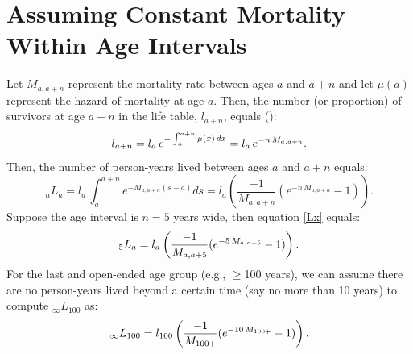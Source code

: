\documentclass[11pt,letterpaper]{article}
\theoremstyle{plain}
\theoremstyle{remark}
\numberwithin{equation}{section}
\begin{document}
\section{Assuming Constant Mortality Within Age Intervals}
Let $M_{a,a+n}$ represent the mortality rate between ages $a$ and
$a+n$ and let $\mu(a)$ represent the hazard of mortality at age
$a$. Then, the number (or proportion) of survivors at age $a+n$ in the
life table, $l_{a+n}$, equals (\cite{PreHeuGui00}):
\begin{equation}
l_{a+n}=l_{a}\,e^{-\int_a^{a+n}\mu(x)\,dx}=l_{a}\,e^{-n\,M_{a,a+n}}.\notag
\end{equation}
Then, the number of person-years lived between ages $a$ and $a+n$ equals:
\begin{equation}
_nL_{a}=l_a\,\int_a^{a+n} e^{-M_{a,a+n}(s-a)} ds=l_a \left(\frac{-1}{M_{a,a+n}}(e^{-n\,M_{a,a+n}}-1) \right).
\label{Lx}
\end{equation}
Suppose the age interval is $n=5$ years wide, then equation \eqref{Lx}
equals:
\begin{equation}
_5L_{a}=l_a \left(\frac{-1}{M_{a,a+5}}(e^{-5\,M_{a,a+5}}-1) \right).\notag
\end{equation}
For the last and open-ended age group (e.g., $\geq$100 years), we can assume there
are no person-years lived beyond a certain time (say no more than 10
years) to compute $_{\infty}L_{100}$ as:
\begin{equation}
_{\infty}L_{100}=l_{100} \left(\frac{-1}{M_{100+}}(e^{-10\,M_{100+}}-1) \right).\notag
\end{equation}


\newpage
\end{document}
